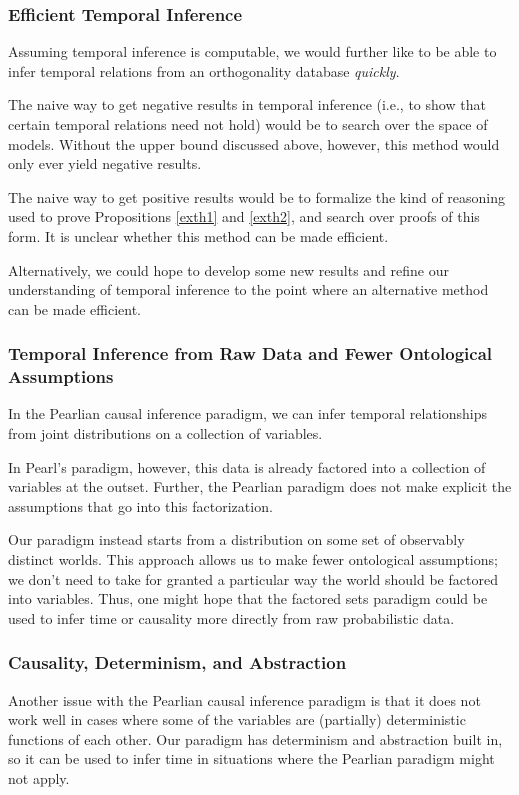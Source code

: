\documentclass[authordate,onecolumn]{miri-tech-article}
\begin{document}
\subsubsection{Efficient Temporal Inference}
Assuming temporal inference is computable, we would further like to be able to infer temporal relations from an orthogonality database \emph{quickly}.

The naive way to get negative results in temporal inference (i.e., to show that certain temporal relations need not hold) would be to search over the space of models. Without the upper bound discussed above, however, this method would only ever yield negative results.

The naive way to get positive results would be to formalize the kind of reasoning used to prove Propositions \ref{exth1} and \ref{exth2}, and search over proofs of this form. It is unclear whether this method can be made efficient.

Alternatively, we could hope to develop some new results and refine our understanding of temporal inference to the point where an alternative method can be made efficient.

\subsubsection{Temporal Inference from Raw Data and Fewer Ontological Assumptions}
In the Pearlian causal inference paradigm, we can infer temporal relationships from joint distributions on a collection of variables.

In Pearl's paradigm, however, this data is already factored into a collection of variables at the outset. Further, the Pearlian paradigm does not make explicit the assumptions that go into this factorization.

Our paradigm instead starts from a distribution on some set of observably distinct worlds. This approach allows us to make fewer ontological assumptions; we don't need to take for granted a particular way the world should be factored into variables. Thus, one might hope that the factored sets paradigm could be used to infer time or causality more directly from raw probabilistic data.

\subsubsection{Causality, Determinism, and Abstraction}
Another issue with the Pearlian causal inference paradigm is that it does not work well in cases where some of the variables are (partially) deterministic functions of each other. Our paradigm has determinism and abstraction built in, so it can be used to infer time in situations where the Pearlian paradigm might not apply.
\end{document}
